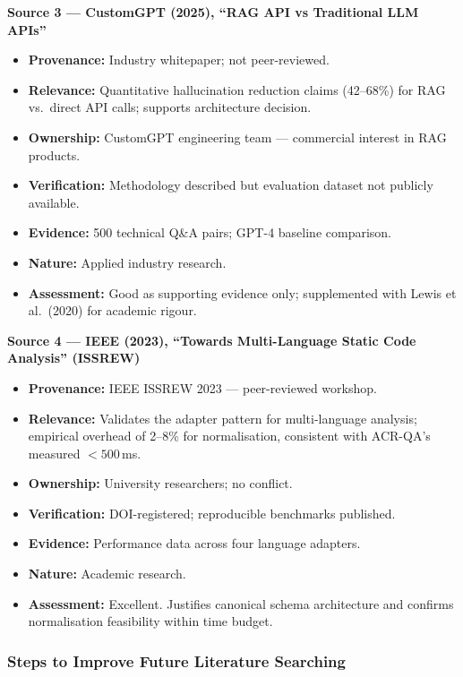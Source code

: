 \documentclass[12pt,a4paper]{article}
\begin{document}
\medskip
\noindent\textbf{Source 3 --- CustomGPT (2025), ``RAG API vs Traditional LLM APIs''}

\begin{itemize}[leftmargin=1.5em,itemsep=2pt]
  \item \textbf{Provenance:} Industry whitepaper; not peer-reviewed.
  \item \textbf{Relevance:} Quantitative hallucination reduction claims
  (42--68\%) for RAG vs.\ direct API calls; supports architecture decision.
  \item \textbf{Ownership:} CustomGPT engineering team --- commercial interest
  in RAG products.
  \item \textbf{Verification:} Methodology described but evaluation dataset
  not publicly available.
  \item \textbf{Evidence:} 500 technical Q\&A pairs; GPT-4 baseline comparison.
  \item \textbf{Nature:} Applied industry research.
  \item \textbf{Assessment:} Good as supporting evidence only; supplemented
  with Lewis et al.\ (2020) for academic rigour.
\end{itemize}

\medskip
\noindent\textbf{Source 4 --- IEEE (2023), ``Towards Multi-Language Static Code
Analysis'' (ISSREW)}

\begin{itemize}[leftmargin=1.5em,itemsep=2pt]
  \item \textbf{Provenance:} IEEE ISSREW 2023 --- peer-reviewed workshop.
  \item \textbf{Relevance:} Validates the adapter pattern for multi-language
  analysis; empirical overhead of 2--8\% for normalisation, consistent with
  ACR-QA's measured $<500$\,ms.
  \item \textbf{Ownership:} University researchers; no conflict.
  \item \textbf{Verification:} DOI-registered; reproducible benchmarks published.
  \item \textbf{Evidence:} Performance data across four language adapters.
  \item \textbf{Nature:} Academic research.
  \item \textbf{Assessment:} Excellent.  Justifies canonical schema architecture
  and confirms normalisation feasibility within time budget.
\end{itemize}

\subsubsection{Steps to Improve Future Literature Searching}
\end{document}
